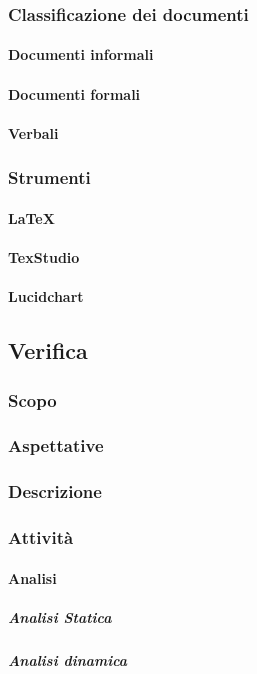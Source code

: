 	\subsubsection{Classificazione dei documenti}
		\paragraph{Documenti informali}
		\paragraph{Documenti formali}
		\paragraph{Verbali}
	\subsubsection{Strumenti}
		\paragraph{\LaTeX}
		\paragraph{TexStudio}
		\paragraph{Lucidchart}
	
\subsection{Verifica}

	\subsubsection{Scopo}
	\subsubsection{Aspettative}
	\subsubsection{Descrizione}
	\subsubsection{Attività}
		\paragraph{Analisi}
			\subparagraph{Analisi Statica}
			\subparagraph{Analisi dinamica}
